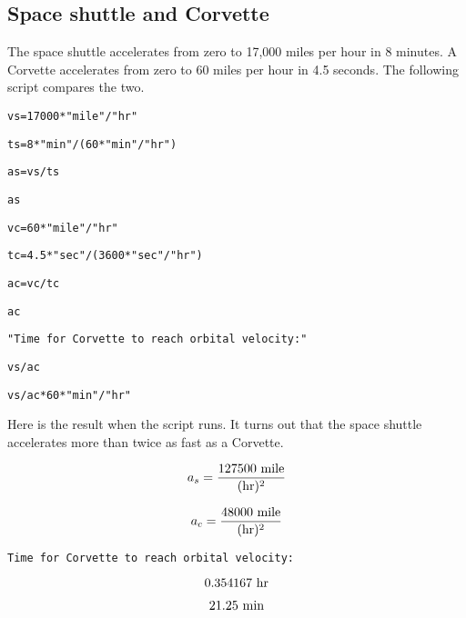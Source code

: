 \subsection{Space shuttle and Corvette}
The space shuttle accelerates from zero to 17{,}000 miles per hour
in 8 minutes.
A Corvette accelerates from zero to 60 miles per hour in 4.5 seconds.
The following script compares the two.

\medskip
\verb$vs=17000*"mile"/"hr"$

\verb$ts=8*"min"/(60*"min"/"hr")$

\verb$as=vs/ts$

\verb$as$

\verb$vc=60*"mile"/"hr"$

\verb$tc=4.5*"sec"/(3600*"sec"/"hr")$

\verb$ac=vc/tc$

\verb$ac$

\verb$"Time for Corvette to reach orbital velocity:"$

\verb$vs/ac$

\verb$vs/ac*60*"min"/"hr"$

\medskip
\noindent
Here is the result when the script runs.
It turns out that the space shuttle accelerates more than twice as fast as a
Corvette.

\medskip
$$a_s={\hbox{127500 mile}\over(\hbox{hr})^2}$$

$$a_c={\hbox{48000 mile}\over(\hbox{hr})^2}$$

\verb$Time for Corvette to reach orbital velocity:$

$$\hbox{0.354167 hr}$$

$$\hbox{21.25 min}$$

